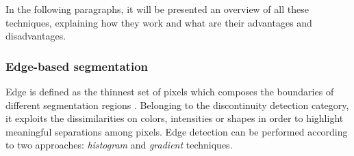 \documentclass[../main.tex]{subfiles}
\begin{document}
In the following paragraphs, it will be presented an overview of all these techniques, explaining how they work and what are their advantages and disadvantages.

\subsubsection{\large{Edge-based segmentation}}

Edge is defined as the thinnest set of pixels which composes the boundaries of different segmentation regions \cite{kang2009comparative}.
Belonging to the discontinuity detection category, it exploits the dissimilarities on colors, intensities or shapes in order to highlight meaningful separations among pixels.
Edge detection can be performed according to two approaches: \textit{histogram} and \textit{gradient} techniques.
\end{document}
